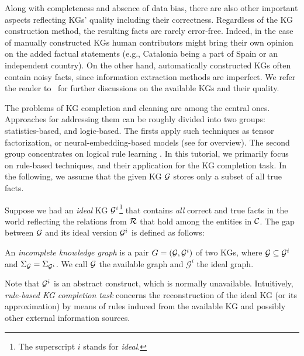 Along with completeness and absence of data bias, there are also other important aspects reflecting KGs' quality %
including %
their correctness. Regardless of the KG construction method, the resulting facts are rarely error-free. Indeed, in the case of manually constructed KGs human contributors might bring their own opinion on the added factual statements (e.g., Catalonia being a part of Spain or an independent country). On the other hand, automatically constructed KGs often contain noisy facts, since information extraction methods are imperfect. We refer the reader to~\cite{Nickel2015ARO,DBLP:journals/semweb/Paulheim17} for further discussions on the available KGs and their quality.



The problems of KG completion and cleaning are %
among the central ones. Approaches for addressing them can be roughly divided into two groups: statistics-based, and logic-based. The firsts apply such techniques as tensor factorization, or neural-embedding-based models (see \cite{DBLP:journals/pieee/Nickel0TG16} for overview). The second group concentrates on logical rule learning \cite{ruleoverview}. In this tutorial, we primarily focus on rule-based techniques, and their application for the KG completion task. In the following, we assume that the given KG $\mathcal{G}$ stores only a subset of all true facts.

Suppose we had an \emph{ideal} KG $\mathcal{G}^i$\footnote{The superscript $i$ stands for \emph{ideal}.} that contains \emph{all} correct and true facts in the world reflecting the relations from $\mathcal{R}$ that hold among the entities in $\mathcal{C}$. The gap between $\mathcal{G}$ and its ideal version $\mathcal{G}^i$ is defined as follows: 

\begin{definition} An \emph{incomplete knowledge graph} is a pair
    $G = (\mathcal{G}, \mathcal{G}^i)$ of two KGs, where $\mathcal{G}\subseteq \mathcal{G}^i$ and
    $\Sigma_{\mathcal{G}}=\Sigma_{\mathcal{G}^i}$. We call $\mathcal{G}$ the available
    graph and $\mathcal{G}^i$ the ideal graph.
\end{definition}
    
Note that $\mathcal{G}^i$ is an abstract construct, which is normally unavailable. Intuitively, \emph{rule-based KG completion task} concerns the reconstruction of the ideal KG (or its approximation) by means of rules induced from the available KG and possibly other external information sources.

